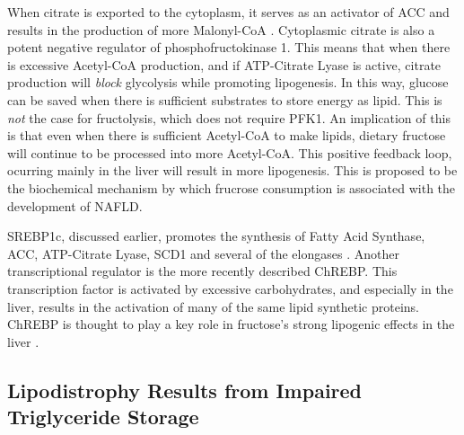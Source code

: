 \documentclass{tufte-handout}
\begin{document}
  When citrate is exported to the cytoplasm, it serves as an activator of ACC and results in the production of more Malonyl-CoA \citep{VAGELOS1963}.  Cytoplasmic citrate is also a potent negative regulator of phosphofructokinase 1.  This means that when there is excessive Acetyl-CoA production, and if ATP-Citrate Lyase is active, citrate production will \emph{block} glycolysis while promoting lipogenesis.  In this way, glucose can be saved when there is sufficient substrates to store energy as lipid.  This is \emph{not} the case for fructolysis, which does not require PFK1.  An implication of this is that even when there is sufficient Acetyl-CoA to make lipids, dietary fructose will continue to be processed into more Acetyl-CoA.  This positive feedback loop, ocurring mainly in the liver will result in more lipogenesis.  This is proposed to be the biochemical mechanism by which frucrose consumption is associated with the development of NAFLD\citep{Lim2010}.

  SREBP1c, discussed earlier, promotes the synthesis of Fatty Acid Synthase, ACC, ATP-Citrate Lyase, SCD1 and several of the elongases \citep{Horton2002b,Moon2012b}.  Another transcriptional regulator is the more recently described ChREBP.  This transcription factor is activated by excessive carbohydrates, and especially in the liver, results in the activation of many of the same lipid synthetic proteins.  ChREBP is thought to play a key role in fructose's strong lipogenic effects in the liver \citep{Kim2016d}.

\subsection{Lipodistrophy Results from Impaired Triglyceride Storage}
\end{document}
